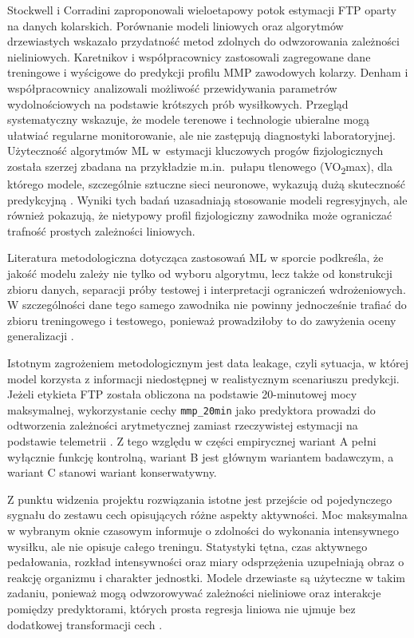 Stockwell i Corradini \parencite{stockwell2023mlftp} zaproponowali wieloetapowy potok estymacji FTP oparty na danych kolarskich. Porównanie modeli liniowych oraz algorytmów drzewiastych wskazało przydatność metod zdolnych do odwzorowania zależności nieliniowych. Karetnikov i współpracownicy \parencite{karetnikov2021cyclingPrediction} zastosowali zagregowane dane treningowe i wyścigowe do predykcji profilu MMP zawodowych kolarzy. Denham i współpracownicy \parencite{denham2020predictftp} analizowali możliwość przewidywania parametrów wydolnościowych na podstawie krótszych prób wysiłkowych. Przegląd systematyczny \textcite{stessens2024cyclingReview} wskazuje, że modele terenowe i technologie ubieralne mogą ułatwiać regularne monitorowanie, ale nie zastępują diagnostyki laboratoryjnej. Użyteczność algorytmów ML w~estymacji kluczowych progów fizjologicznych została szerzej zbadana na przykładzie m.in.\ pułapu tlenowego (VO\textsubscript{2}max), dla którego modele, szczególnie sztuczne sieci neuronowe, wykazują dużą skuteczność predykcyjną \parencite{ashfaq2022vo2max_ml_review}. Wyniki tych badań uzasadniają stosowanie modeli regresyjnych, ale również pokazują, że nietypowy profil fizjologiczny zawodnika może ograniczać trafność prostych zależności liniowych.

Literatura metodologiczna dotycząca zastosowań ML w sporcie podkreśla, że jakość modelu zależy nie tylko od wyboru algorytmu, lecz także od konstrukcji zbioru danych, separacji próby testowej i interpretacji ograniczeń wdrożeniowych. W szczególności dane tego samego zawodnika nie powinny jednocześnie trafiać do zbioru treningowego i testowego, ponieważ prowadziłoby to do zawyżenia oceny generalizacji \parencite{richter2021sportsMl,rossi2022sportsMl,fuller2022physicalActivityMl}.

Istotnym zagrożeniem metodologicznym jest data leakage, czyli sytuacja, w której model korzysta z informacji niedostępnej w realistycznym scenariuszu predykcji. Jeżeli etykieta FTP została obliczona na podstawie 20-minutowej mocy maksymalnej, wykorzystanie cechy \texttt{mmp\_20min} jako predyktora prowadzi do odtworzenia zależności arytmetycznej zamiast rzeczywistej estymacji na podstawie telemetrii \parencite{kaufman2012leakage,bernett2024leakage,dong2022sportsWearableLeakage}. Z tego względu w części empirycznej wariant A pełni wyłącznie funkcję kontrolną, wariant B jest głównym wariantem badawczym, a wariant C stanowi wariant konserwatywny.

Z punktu widzenia projektu rozwiązania istotne jest przejście od pojedynczego sygnału do zestawu cech opisujących różne aspekty aktywności. Moc maksymalna w wybranym oknie czasowym informuje o zdolności do wykonania intensywnego wysiłku, ale nie opisuje całego treningu. Statystyki tętna, czas aktywnego pedałowania, rozkład intensywności oraz miary odsprzężenia uzupełniają obraz o reakcję organizmu i charakter jednostki. Modele drzewiaste są użyteczne w takim zadaniu, ponieważ mogą odwzorowywać zależności nieliniowe oraz interakcje pomiędzy predyktorami, których prosta regresja liniowa nie ujmuje bez dodatkowej transformacji cech \parencite{hastie2009esl,james2021isl}.

